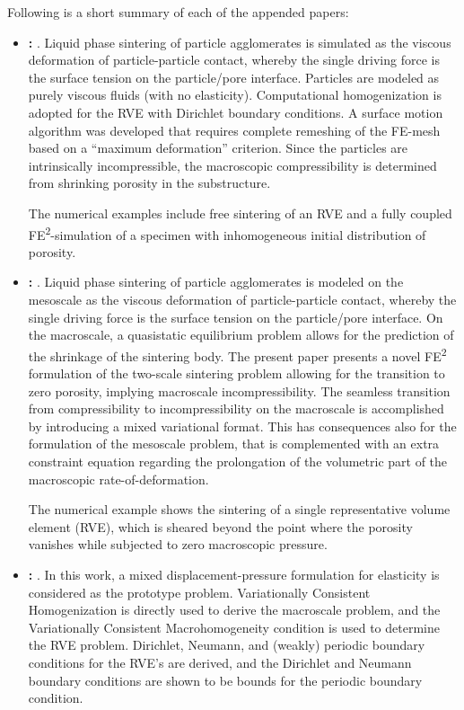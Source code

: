 \documentclass[MikaelDissertation.tex]{subfiles}
\begin{document}
Following is a short summary of each of the appended papers:
\begin{itemize}
 \item \textbf{: }.
Liquid phase sintering of particle agglomerates is simulated as the viscous deformation of particle-particle contact, whereby the single driving force is the surface tension on the particle/pore interface.
Particles are modeled as purely viscous fluids (with no elasticity). 
Computational homogenization is adopted for the RVE with Dirichlet boundary conditions.
A surface motion algorithm was developed that requires complete remeshing of the FE-mesh based on a ``maximum deformation'' criterion. 
Since the particles are intrinsically incompressible, the macroscopic compressibility is determined from shrinking porosity in the substructure.

The numerical examples include free sintering of an RVE and a fully coupled FE\textsuperscript{2}-simulation of a specimen with inhomogeneous initial distribution of porosity.

 \item \textbf{: }.
Liquid phase sintering of particle agglomerates is modeled on the mesoscale as the viscous deformation of particle-particle contact, whereby the single driving force is the surface tension on the particle/pore interface.
On the macroscale, a quasistatic equilibrium problem allows for the prediction of the shrinkage of the sintering body. 
The present paper presents a novel FE\textsuperscript{2} formulation of the two-scale sintering problem allowing for the transition to zero porosity, implying macroscale incompressibility.
The seamless transition from compressibility to incompressibility on the macroscale is accomplished by introducing a mixed variational format.
This has consequences also for the formulation of the mesoscale problem, that is complemented with an extra constraint equation regarding the prolongation of the volumetric part of the macroscopic rate-of-deformation.

The numerical example shows the sintering of a single representative volume element (RVE), which is sheared beyond the point where the porosity vanishes while subjected to zero macroscopic pressure.

 \item \textbf{: }.
In this work, a mixed displacement-pressure formulation for elasticity is considered as the prototype problem.
Variationally Consistent Homogenization is directly used to derive the macroscale problem, and the Variationally Consistent Macrohomogeneity condition is used to determine the RVE problem.
Dirichlet, Neumann, and (weakly) periodic boundary conditions for the RVE's are derived, and the Dirichlet and Neumann boundary conditions are shown to be bounds for the periodic boundary condition.


\end{itemize}
\end{document}
